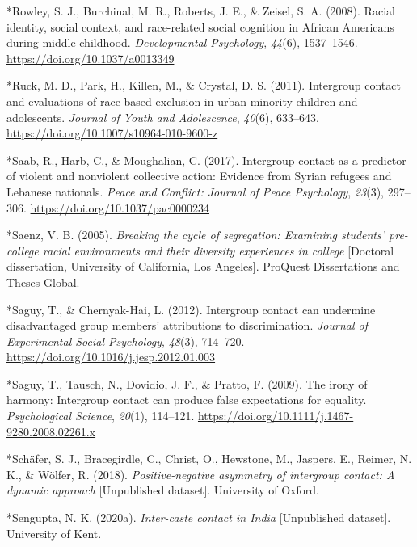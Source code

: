 \documentclass[12pt, letterpaper]{article}
\begin{document}
\leavevmode\hypertarget{ref-703}{}%
*Rowley, S. J., Burchinal, M. R., Roberts, J. E., \& Zeisel, S. A.
(2008). Racial identity, social context, and race-related social
cognition in African Americans during middle childhood.
\emph{Developmental Psychology}, \emph{44}(6), 1537--1546.
\url{https://doi.org/10.1037/a0013349}

\leavevmode\hypertarget{ref-244}{}%
*Ruck, M. D., Park, H., Killen, M., \& Crystal, D. S. (2011). Intergroup
contact and evaluations of race-based exclusion in urban minority
children and adolescents. \emph{Journal of Youth and Adolescence},
\emph{40}(6), 633--643. \url{https://doi.org/10.1007/s10964-010-9600-z}

\leavevmode\hypertarget{ref-1114}{}%
*Saab, R., Harb, C., \& Moughalian, C. (2017). Intergroup contact as a
predictor of violent and nonviolent collective action: Evidence from
Syrian refugees and Lebanese nationals. \emph{Peace and Conflict:
Journal of Peace Psychology}, \emph{23}(3), 297--306.
\url{https://doi.org/10.1037/pac0000234}

\leavevmode\hypertarget{ref-2333}{}%
*Saenz, V. B. (2005). \emph{Breaking the cycle of segregation: Examining
students' pre-college racial environments and their diversity
experiences in college} {[}Doctoral dissertation, University of
California, Los Angeles{]}. ProQuest Dissertations and Theses Global.

\leavevmode\hypertarget{ref-4005}{}%
*Saguy, T., \& Chernyak-Hai, L. (2012). Intergroup contact can undermine
disadvantaged group members' attributions to discrimination.
\emph{Journal of Experimental Social Psychology}, \emph{48}(3),
714--720. \url{https://doi.org/10.1016/j.jesp.2012.01.003}

\leavevmode\hypertarget{ref-813}{}%
*Saguy, T., Tausch, N., Dovidio, J. F., \& Pratto, F. (2009). The irony
of harmony: Intergroup contact can produce false expectations for
equality. \emph{Psychological Science}, \emph{20}(1), 114--121.
\url{https://doi.org/10.1111/j.1467-9280.2008.02261.x}

\leavevmode\hypertarget{ref-2382}{}%
*Schäfer, S. J., Bracegirdle, C., Christ, O., Hewstone, M., Jaspers, E.,
Reimer, N. K., \& Wölfer, R. (2018). \emph{Positive-negative asymmetry
of intergroup contact: A dynamic approach} {[}Unpublished dataset{]}.
University of Oxford.

\leavevmode\hypertarget{ref-2392}{}%
*Sengupta, N. K. (2020a). \emph{Inter-caste contact in India}
{[}Unpublished dataset{]}. University of Kent.
\end{document}
